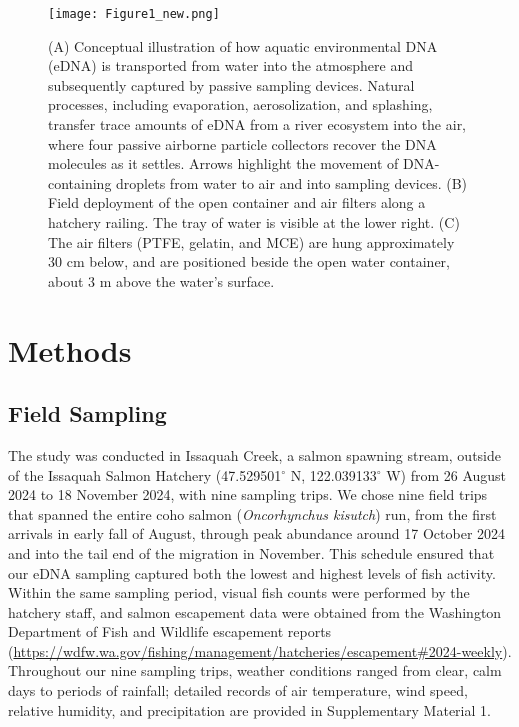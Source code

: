 \documentclass{article}
\begin{document}
\begin{figure}[tbhp] 
\centering
\texttt{[image: Figure1\_new.png]}  
\caption{(A) Conceptual illustration of how aquatic environmental DNA (eDNA) is transported from water into the atmosphere and subsequently captured by passive sampling devices. Natural processes, including evaporation, aerosolization, and splashing, transfer trace amounts of eDNA from a river ecosystem into the air, where four passive airborne particle collectors recover the DNA molecules as it settles. Arrows highlight the movement of DNA-containing droplets from water to air and into sampling devices. (B) Field deployment of the open container and air filters along a hatchery railing. The tray of water is visible at the lower right. (C) The air filters (PTFE, gelatin, and MCE) are hung approximately 30 cm below, and are positioned beside the open water container, about 3 m above the water’s surface.}
\label{fig:AI_physical_model}
\end{figure}

\section{Methods}

\subsection{Field Sampling}

The study was conducted in Issaquah Creek, a salmon spawning stream, outside of the Issaquah Salmon Hatchery (47.529501$^\circ$ N, 122.039133$^\circ$ W) from 26 August 2024 to 18 November 2024, with nine sampling trips. We chose nine field trips that spanned the entire coho salmon (\textit{Oncorhynchus kisutch}) run, from the first arrivals in early fall of August, through peak abundance around 17 October 2024 and into the tail end of the migration in November. This schedule ensured that our eDNA sampling captured both the lowest and highest levels of fish activity. Within the same sampling period, visual fish counts were performed by the hatchery staff, and salmon escapement data were obtained from the Washington Department of Fish and Wildlife escapement reports (\href{https://wdfw.wa.gov/fishing/management/hatcheries/escapement#2024-weekly}{https://wdfw.wa.gov/fishing/management/hatcheries/escapement\#2024-weekly}). Throughout our nine sampling trips, weather conditions ranged from clear, calm days to periods of  rainfall; detailed records of air temperature, wind speed, relative humidity, and precipitation are provided in Supplementary Material 1.
\end{document}
